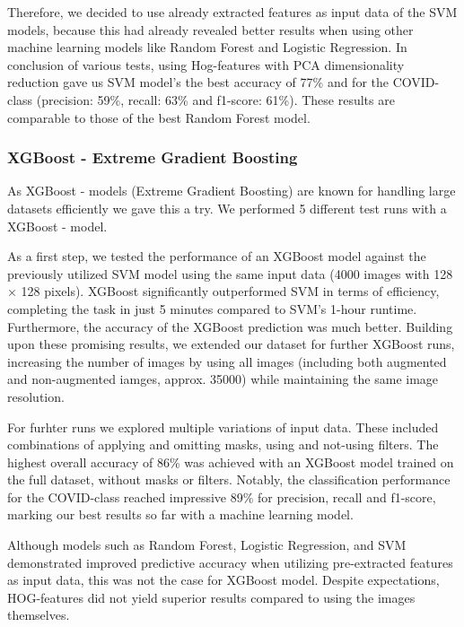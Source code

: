 \documentclass{article}
\begin{document}
Therefore, we decided to use already extracted features as input data of the SVM models, because this had already revealed better results when using other machine learning models like Random Forest and Logistic Regression. In conclusion of various tests, using Hog-features with PCA dimensionality reduction gave us SVM model's the best accuracy of 77\% and for the COVID-class (precision: 59\%, recall: 63\% and f1-score: 61\%). These results are comparable to those of the best Random Forest model.


\subsubsection{XGBoost - Extreme Gradient Boosting}
As XGBoost - models (Extreme Gradient Boosting) are known for handling large datasets efficiently we gave this a try. We performed 5 different test runs with a XGBoost - model. 

As a first step, we tested the performance of an XGBoost model against the previously utilized SVM model using the same input data (4000 images with 128 × 128 pixels). XGBoost significantly outperformed SVM in terms of efficiency, completing the task in just 5 minutes compared to SVM’s 1-hour runtime. Furthermore, the accuracy of the XGBoost prediction was much better. 
Building upon these promising results, we extended our dataset for further XGBoost runs, increasing the number of images by using all images (including both augmented and non-augmented iamges, approx. 35000) while maintaining the same image resolution.

For furhter runs we explored multiple variations of input data. These included combinations of applying and omitting masks, using and not-using filters. The highest overall accuracy of 86\% was achieved with an XGBoost model trained on the full dataset, without masks or filters. Notably, the classification performance for the COVID-class reached impressive 89\% for precision, recall and f1-score, marking our best results so far with a machine learning model.

Although models such as Random Forest, Logistic Regression, and SVM demonstrated improved predictive accuracy when utilizing pre-extracted features as input data, this was not the case for XGBoost model. Despite expectations, HOG-features did not yield superior results compared to using the images themselves.
\end{document}

